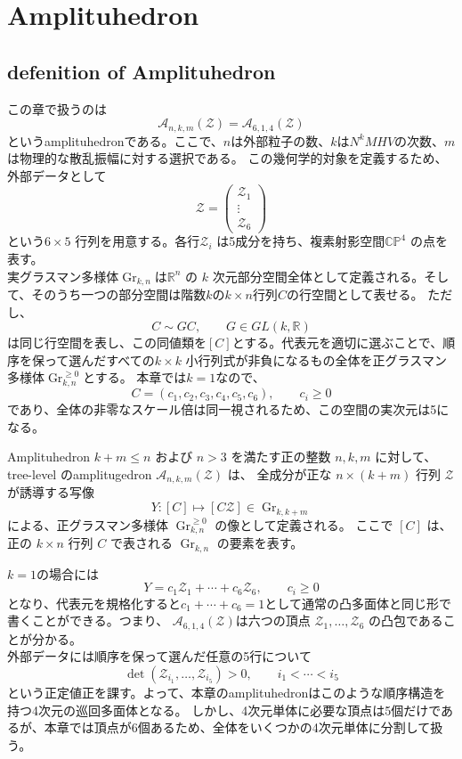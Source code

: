 \documentclass[uplatex,dvipdfmx,a4paper,11pt]{jsarticle}
\numberwithin{equation}{section}
\begin{document}
\section{Amplituhedron}
\subsection{defenition of Amplituhedron}
この章で扱うのは
\[
\mathcal A_{n,k,m}(\mathcal Z) = \mathcal A_{6,1,4}(\mathcal Z)
\]
というamplituhedronである。ここで、$n$は外部粒子の数、$k$は$N^k MHV$の次数、$m$は物理的な散乱振幅に対する選択である。
この幾何学的対象を定義するため、外部データとして
\[
\mathcal Z=
\begin{pmatrix}
\mathcal Z_1\\
\vdots\\
\mathcal Z_6
\end{pmatrix}
\]
という\(6\times5\) 行列を用意する。各行\(\mathcal Z_i\) は5成分を持ち、複素射影空間\(\mathbb {CP}^4\) の点を表す。\\
実グラスマン多様体$\operatorname{Gr}_{k,n}$は\(\mathbb R^n\) の \(k\) 次元部分空間全体として定義される。そして、そのうち一つの部分空間は階数$k$の$k\times n$行列$C$の行空間として表せる。
ただし、
\[
C\sim GC,
\qquad G\in GL(k,\mathbb R)
\]
は同じ行空間を表し、この同値類を\([C]\)とする。代表元を適切に選ぶことで、順序を保って選んだすべての\(k\times k\) 小行列式が非負になるもの全体を正グラスマン多様体$\operatorname{Gr}_{k,n}^{\geq0}$とする。
本章では$k = 1$なので、
\[
C=(c_1,c_2,c_3,c_4,c_5,c_6),
\qquad c_i\geq0
\]
であり、全体の非零なスケール倍は同一視されるため、この空間の実次元は5になる。
\begin{mydef}{Amplituhedron}
  $k+m\leq n$ および $n>3$ を満たす正の整数 $n,k,m$ に対して、
  tree-level のamplitugedron
  $\mathcal{A}_{n,k,m}(\mathcal{Z})$ は、
  全成分が正な $n\times(k+m)$ 行列 $\mathcal{Z}$ が誘導する写像
  \begin{equation}
    Y:[C]\longmapsto[C\mathcal{Z}]
    \in\operatorname{Gr}_{k,k+m}
    \tag{71}
  \end{equation}
  による、正グラスマン多様体
  $\operatorname{Gr}_{k,n}^{\geq0}$ の像として定義される。
  ここで $[C]$ は、正の $k\times n$ 行列 $C$ で表される
  $\operatorname{Gr}_{k,n}$ の要素を表す。
\end{mydef}
$k=1$の場合には
\[
Y=c_1\mathcal Z_1+\cdots+c_6\mathcal Z_6,
\qquad c_i\geq0
\]
となり、代表元を規格化すると$c_1+\cdots+c_6=1$として通常の凸多面体と同じ形で書くことができる。つまり、
$\mathcal{A}_{6,1,4}(\mathcal{Z})$は六つの頂点 \(\mathcal Z_1,\ldots,\mathcal Z_6\) の凸包であることが分かる。\\
外部データには順序を保って選んだ任意の5行について
\[
\det(\mathcal Z_{i_1},\ldots,\mathcal Z_{i_5})>0,
\qquad i_1<\cdots<i_5
\]
という正定値正を課す。よって、本章のamplituhedronはこのような順序構造を持つ4次元の巡回多面体となる。
しかし、4次元単体に必要な頂点は5個だけであるが、本章では頂点が6個あるため、全体をいくつかの4次元単体に分割して扱う。
\end{document}
